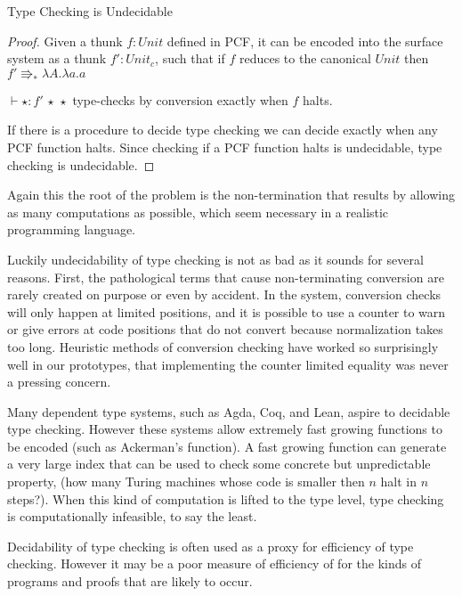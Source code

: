 \begin{thm}
Type Checking is Undecidable
\end{thm}
 
\begin{proof}
Given a thunk $f:Unit$ defined in PCF, it can be encoded into the surface system as a thunk $f':Unit_{c}$, such that if $f$ reduces to the canonical $Unit$ then $f'\Rrightarrow_{\ast}\lambda A.\lambda a.a$
 
$\vdash\star:f'\,\star\,\star$ type-checks by conversion exactly when $f$ halts.
 
If there is a procedure to decide type checking we can decide exactly when any PCF function halts.
Since checking if a PCF function halts is undecidable, type checking is undecidable.
 
\end{proof}
 
Again this the root of the problem is the non-termination that results by allowing as many computations as possible, which seem necessary in a realistic programming language.
 
Luckily undecidability of type checking is not as bad as it sounds for several reasons.
First, the pathological terms that cause non-terminating conversion are rarely created on purpose or even by accident.
In the \bidir{} system, conversion checks will only happen at limited positions, and it is possible to use a counter to warn or give errors at code positions that do not convert because normalization takes too long.
Heuristic methods of conversion checking have worked so surprisingly well in our prototypes, that implementing the counter limited equality was never a pressing concern.
 
Many dependent type systems, such as Agda, Coq, and Lean, aspire to decidable type checking.
However these systems allow extremely fast growing functions to be encoded (such as Ackerman's function).
A fast growing function can generate a very large index that can be used to check some concrete but unpredictable property, (how many Turing machines whose code is smaller then $n$ halt in $n$ steps?).
When this kind of computation is lifted to the type level, type checking is computationally infeasible, to say the least.
 
Decidability of type checking is often used as a proxy for efficiency of type checking.
However it may be a poor measure of efficiency of for the kinds of programs and proofs that are likely to occur.
 
